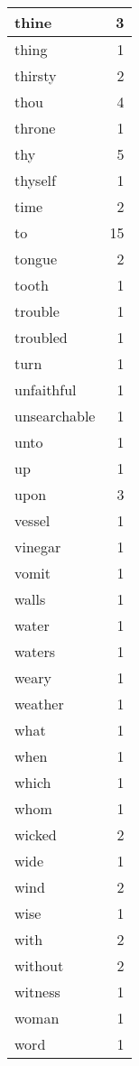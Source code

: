 \begin{center}
\begin{longtable}{l|r}
thine & 3\\ \hline 
thing & 1\\ \hline 
thirsty & 2\\ \hline 
thou & 4\\ \hline 
throne & 1\\ \hline 
thy & 5\\ \hline 
thyself & 1\\ \hline 
time & 2\\ \hline 
to & 15\\ \hline 
tongue & 2\\ \hline 
tooth & 1\\ \hline 
trouble & 1\\ \hline 
troubled & 1\\ \hline 
turn & 1\\ \hline 
unfaithful & 1\\ \hline 
unsearchable & 1\\ \hline 
unto & 1\\ \hline 
up & 1\\ \hline 
upon & 3\\ \hline 
vessel & 1\\ \hline 
vinegar & 1\\ \hline 
vomit & 1\\ \hline 
walls & 1\\ \hline 
water & 1\\ \hline 
waters & 1\\ \hline 
weary & 1\\ \hline 
weather & 1\\ \hline 
what & 1\\ \hline 
when & 1\\ \hline 
which & 1\\ \hline 
whom & 1\\ \hline 
wicked & 2\\ \hline 
wide & 1\\ \hline 
wind & 2\\ \hline 
wise & 1\\ \hline 
with & 2\\ \hline 
without & 2\\ \hline 
witness & 1\\ \hline 
woman & 1\\ \hline 
word & 1\\ \hline 
\end{longtable}  
\end{center}  


